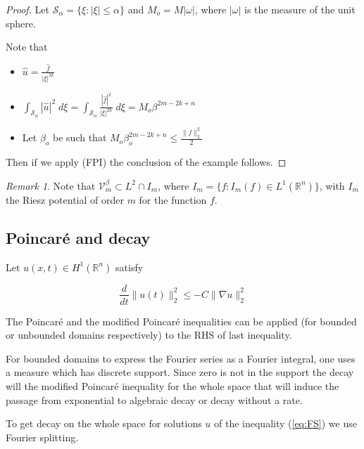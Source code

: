 \documentclass{amsart}
\numberwithin{Theorem}{section}
\numberwithin{equation}{section}
\theoremstyle{definition}
\theoremstyle{remark}
\newtheorem{Remark}[Theorem]{Remark}
\begin{document}
\begin{proof}

Let ${{\mathcal S}}_{\alpha}= \{ \xi: |\xi| \leq \alpha\}$ and $M_o = M |\omega|$, where $|\omega|$ is the measure of the unit sphere.

Note that

\begin{itemize}
\item  $ \widehat{u} = \frac{\widehat{f}}{|\xi|^{2k}} $
\item  $\int_{{{\mathcal S}}_{\alpha}} |\widehat{u}|^2\; d\xi  = \int_{{{\mathcal S}}_{\alpha}} \frac{|\widehat{f}|^2}{|\xi|^{2k}}\; d\xi= M_o \beta^{2m-2k+n}$
\item Let $\beta_o $ be such that $ M_o \beta_o^{2m-2k+n} \leq \frac{\|f\|_2^2}{2}$
\end{itemize}

Then if we apply (FPI)   the conclusion of the example follows.

\end{proof}

\begin{Remark} Note that ${{\mathcal V}}_m^{\beta} \subset L^2 \cap I_m$, where $I_m =\{f: I_m(f) \in L^1({{\mathbb R}^n})\}$,
with $I_m$ the Riesz potential of order $m$ for the function $f$.
\end{Remark}

\subsection{ Poincar\'e and decay}

Let  $u(x,t)\in H^1({{\mathbb R}^n})$ satisfy

\begin{equation} \label{eq:FS} \frac{d}{dt} \|u(t)\|_2^2 \leq -C\|\nabla u\|_2^2\end{equation}

The Poincar\'e  and the modified Poincar\'e inequalities  can be applied (for bounded or unbounded domains respectively) to the RHS of last inequality.

For  bounded domains to express the Fourier series as a Fourier integral, one uses a measure which has discrete support. Since  zero is not in the support the decay will the modified Poincar\'e inequality for the whole space that will induce the passage from exponential to algebraic decay or decay without a rate.

\medskip

To get decay on the whole space  for solutions $u$ of the inequality  (\ref{eq:FS}) we use Fourier splitting.
\end{document}
